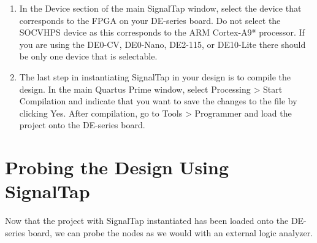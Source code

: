 \documentclass[11pt, twoside, pdftex]{article}
\begin{document}
\begin{enumerate}
\item In the Device section of the main SignalTap window, select the device that corresponds to the FPGA on your DE-series board.
Do not select the {\sf SOCVHPS} device as this corresponds to the ARM Cortex-A9* processor.
If you are using the DE0-CV, DE0-Nano, DE2-115, or DE10-Lite there should be only one device that is selectable.
\item The last step in instantiating SignalTap in your design is to compile the design. In the main Quartus Prime window,
select {\sf Processing > Start Compilation} and indicate that you want to save the changes to the file by clicking {\sf Yes}.
After compilation, go to {\sf Tools > Programmer} and load
the project onto the DE-series board.
\end{enumerate}

\section{Probing the Design Using SignalTap}

Now that the project with SignalTap instantiated has been loaded onto the DE-series board, we can
probe the nodes as we would with an external logic analyzer.
\end{document}
